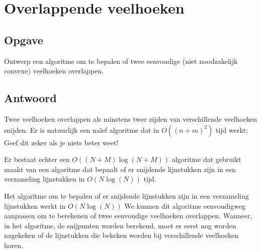\documentclass[examenvragen.tex]{subfiles}
\begin{document}
\section{Overlappende veelhoeken}
\subsection{Opgave}
Ontwerp een algoritme om te bepalen of twee eenvoudige (niet noodzakelijk convexe) veelhoeken overlappen.

\subsection{Antwoord}
Twee veelhoeken overlappen als minstens twee zijden van verschillende veelhoeken snijden. Er is natuurlijk een na\"ief algoritme dat in $O((n+m)^2)$ tijd werkt; Geef dit zeker als je niets beter weet!

Er bestaat echter een $O((N+M)\log(N+M))$ algoritme dat gebruikt maakt van een algoritme dat bepaalt of er snijdende lijnstukken zijn in een verzameling lijnstukken in $O(N\log(N))$ tijd.

Het algoritme om te bepalen of er snijdende lijnstukken zijn in een verzameling lijnstukken werkt in $O(N\log(N))$ We kunnen dit algoritme eenvoudigweg aanpassen om te berekenen of twee eenvoudige veelhoeken overlappen. Wanneer, in het algoritme, de snijpunten worden berekend, moet er eerst nog worden nagekeken of de lijnstukken die bekeken worden bij verschillende veelhoeken horen. 
\end{document}
